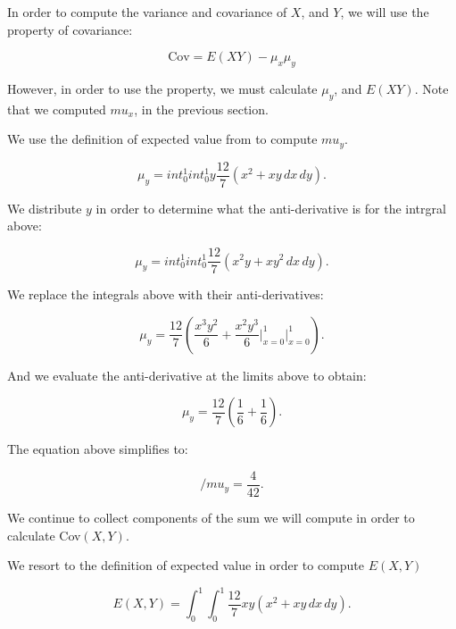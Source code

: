\documentclass[a5paper,11pt]{article}
\begin{document}
In order to compute the variance and 
covariance of $X$, and $Y$, we will use
the property of covariance:

\begin{equation}
\text{Cov} = E \left(XY \right) 
- \mu_x\mu_y
\end{equation}

However, in order to use the property, 
we must calculate $\mu_y$, and 
$E\left(XY \right)$. Note that we computed
$mu_x$, in the previous section.

We use the definition of expected value
from \cite{reading6a} to compute $mu_y$.

\begin{equation}
\mu_y = int_0^1 int_0^1 y \frac{12}{7} 
\left(
x^2 + xy \,dx \,dy  \right). 
\end{equation}


We distribute $y$ in order to determine
what the anti-derivative is for the
intrgral above:

\begin{equation}
\mu_y = int_0^1 int_0^1  \frac{12}{7} 
\left(
x^2y + xy^2 \,dx \,dy  \right). 
\end{equation}

We replace the integrals above with their
anti-derivatives:

\begin{equation}
\mu_y = \frac{12}{7} 
\left(
\frac{x^3y^2}{6} + \frac{x^2y^3}{6} 
\bigg\rvert_{x=0}^1 \bigg\rvert_{x=0}^1
 \right). 
\end{equation}

And we evaluate the anti-derivative at the
limits above to obtain:

\begin{equation}
\mu_y = \frac{12}{7} 
\left(
\frac{1}{6} + \frac{1}{6} 
 \right). 
\end{equation}

The equation above simplifies to:

\begin{equation}
/mu_y = \frac{4}{42}. 
\end{equation}

We continue to collect components of the
sum we will compute in order to calculate
Cov$\left(X,Y \right)$.

We resort to the definition of expected
value in order to compute 
$E\left( X,Y \right)$

\begin{equation}
E\left( X,Y \right)=
\int_0^1 \int_0^1
\frac{12}{7} xy \left(x^2 + xy \,dx \,dy
\right).
\end{equation}
\end{document}
